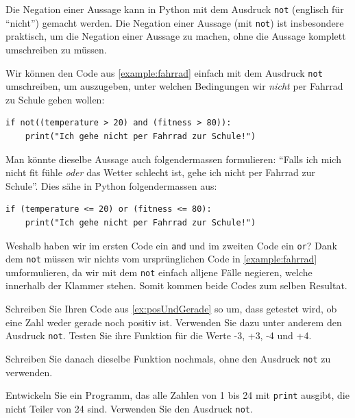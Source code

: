 Die Negation einer Aussage kann in Python mit dem Ausdruck \lstinline|not| (englisch für \enquote{nicht}) gemacht werden. Die Negation einer Aussage (mit \lstinline|not|) ist insbesondere praktisch, um die Negation einer Aussage zu machen, ohne die Aussage komplett umschreiben zu müssen.

\begin{myexample}
Wir können den Code aus \cref{example:fahrrad} einfach mit dem Ausdruck \lstinline|not| umschreiben, um auszugeben, unter welchen Bedingungen wir \textit{nicht} per Fahrrad zu Schule gehen wollen:
\begin{lstlisting}
if not((temperature > 20) and (fitness > 80)):
	print("Ich gehe nicht per Fahrrad zur Schule!")
\end{lstlisting}
Man könnte dieselbe Aussage auch folgendermassen formulieren: \enquote{Falls ich mich nicht fit fühle \textit{oder} das Wetter schlecht ist, gehe ich nicht per Fahrrad zur Schule}. Dies sähe in Python folgendermassen aus:
\begin{lstlisting}
if (temperature <= 20) or (fitness <= 80):
	print("Ich gehe nicht per Fahrrad zur Schule!")
\end{lstlisting}
Weshalb haben wir im ersten Code ein \lstinline|and| und im zweiten Code ein \lstinline|or|? Dank dem \lstinline|not| müssen wir nichts vom ursprünglichen Code in \cref{example:fahrrad} umformulieren, da wir mit dem \lstinline|not| einfach alljene Fälle negieren, welche innerhalb der Klammer stehen. Somit kommen beide Codes zum selben Resultat.
\end{myexample}

\begin{myexercise}
	Schreiben Sie Ihren Code aus \cref{ex:posUndGerade} so um, dass getestet wird, ob eine Zahl weder gerade noch positiv ist. Verwenden Sie dazu unter anderem den Ausdruck \lstinline|not|. Testen Sie ihre Funktion für die Werte -3, +3, -4 und +4.

	Schreiben Sie danach dieselbe Funktion nochmals, ohne den Ausdruck \lstinline|not| zu verwenden.
	\begin{myanswer}
		
	\end{myanswer}
\end{myexercise}

\begin{myexercise}
	Entwickeln Sie ein Programm, das alle Zahlen von 1 bis 24 mit \lstinline|print| ausgibt, die nicht Teiler von 24 sind. Verwenden Sie den Ausdruck \lstinline|not|.
	\begin{myanswer}
		
	\end{myanswer}
\end{myexercise}

